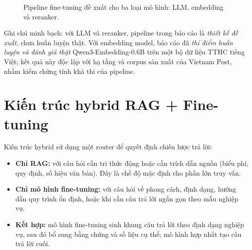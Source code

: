 \begin{figure}[htbp]
\centering
{}
\caption{Pipeline fine-tuning đề xuất cho ba loại mô hình: LLM, embedding và reranker.}
\label{fig:pipeline-ft}
\end{figure}

\begin{ghichu}
Ghi chú minh bạch: với LLM và reranker, pipeline \ft{} trong báo cáo là \emph{thiết kế đề
xuất}, chưa huấn luyện thật. Với embedding model, báo cáo đã \emph{thí điểm huấn luyện và
đánh giá thật} Qwen3-Embedding-0.6B trên một bộ dữ liệu TTHC tiếng Việt; kết quả này độc lập
với hạ tầng và corpus sản xuất của Vietnam Post, nhằm kiểm chứng tính khả thi của pipeline.
\end{ghichu}

\section{Kiến trúc hybrid RAG + Fine-tuning}
\label{sec:kien-truc-lai}

Kiến trúc hybrid sử dụng một router để quyết định chiến lược trả lời:

\begin{itemize}
  \item \textbf{Chỉ RAG:} với câu hỏi cần tri thức động hoặc cần trích dẫn nguồn (biểu phí,
  quy định, số hiệu văn bản). Đây là chế độ mặc định cho phần lớn truy vấn.
  \item \textbf{Chỉ mô hình fine-tuning:} với câu hỏi về phong cách, định dạng, hướng dẫn quy
  trình ổn định, hoặc khi cần câu trả lời ngắn gọn theo mẫu nghiệp vụ.
  \item \textbf{Kết hợp:} mô hình fine-tuning sinh khung câu trả lời theo định dạng nghiệp vụ,
  sau đó \rag{} bổ sung bằng chứng và số liệu cụ thể; mô hình hợp nhất tạo câu trả lời cuối.
\end{itemize}

